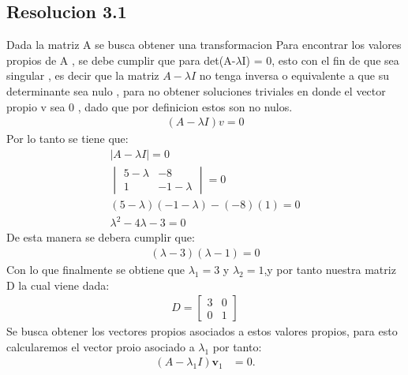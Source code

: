 \documentclass[
  11pt,
  letterpaper,
   addpoints,
   answers
  ]{exam}
\begin{document}
\begin{questions}
\begin{solution}
        \subsection*{Resolucion 3.1}
        Dada la matriz A se busca obtener una transformacion 
    Para encontrar los valores propios de A , se debe cumplir que para det(A-$\lambda$I) = 0, esto con el fin de que sea singular , es decir que la matriz $A-\lambda I$ no tenga inversa o equivalente a que su determinante sea nulo , para no obtener soluciones triviales en donde el vector propio v sea 0 , dado que por definicion estos son no nulos.
    \begin{align}
        (A-\lambda I)v = 0
    \end{align}
    Por lo tanto se tiene que:
    \begin{align}
        |A-\lambda I| = 0\\
        \begin{vmatrix}
            5-\lambda & -8\\
            1 & -1-\lambda
        \end{vmatrix} = 0\\
        (5-\lambda)(-1-\lambda) - (-8)(1) = 0\\
        \lambda^{2} - 4\lambda - 3 = 0
    \end{align}
    De esta manera se debera cumplir que:
    \begin{align}
        (\lambda -3)(\lambda -1) =0
    \end{align}
    Con lo que finalmente se obtiene que $\lambda_{1} = 3$ y $\lambda_{2} = 1$,y por tanto nuestra matriz D la cual viene dada:
    \begin{align}
        D = \begin{bmatrix}
            3 & 0\\
            0 & 1
        \end{bmatrix}
    \end{align}
     Se busca obtener los vectores propios asociados a estos valores propios, para esto calcularemos el vector proio asociado a $\lambda_{1}$ por tanto:
     \begin{align}
        (A - \lambda_1 I)\mathbf{v}_1 &= 0.
    \end{align}
    

\end{solution}
\end{questions}
\end{document}
